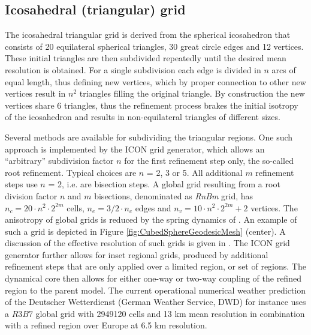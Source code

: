 \documentclass[gmd, manuscript]{copernicus}
\begin{document}

\subsection{Icosahedral (triangular) grid} \label{sec:grid_ico_tri}

The icosahedral triangular grid is derived from the spherical icosahedron that consists of 20 equilateral spherical triangles, 30 great circle edges and 12 vertices.  These initial triangles are then subdivided repeatedly until the desired mean resolution is obtained. For a single subdivision each edge is divided in $n$ arcs of equal length, thus defining new vertices, which by proper connection to other new vertices result in $n^{2}$ triangles filling the original triangle. By construction the new vertices share 6 triangles, thus the refinement process brakes the initial isotropy of the icosahedron and results in non-equilateral triangles of different sizes.

Several methods are available for subdividing the triangular regions.  One such approach is implemented by the ICON grid generator, which allows an ``arbitrary'' subdivision factor $n$ for the first refinement step only, the so-called root refinement. Typical choices are $n$ = 2, 3 or 5. All additional $m$ refinement steps use $n$ = 2, i.e. are bisection steps. A global grid resulting from a root division factor $n$ and $m$ bisections, denominated as \textit{RnBm} grid,  has $n_c = 20 \cdot n^2 \cdot 2^{2m}$ cells, $n_e = 3/2 \cdot n_c$ edges and $n_v = 10\cdot n^{2}\cdot 2^{2m}+2$ vertices. The anisotropy of global grids is reduced by the spring dynamics of \cite{tomita2001shallow}.  An example of such a grid is depicted in Figure \ref{fig:CubedSphereGeodesicMesh} (center).  A discussion of the effective resolution of such grids is given in \cite{dipankar2015large}.  The ICON grid generator further allows for inset regional grids, produced by additional refinement steps that are only applied over a limited region, or set of regions.  The dynamical core then allows for either one-way or two-way coupling of the refined region to the parent model. The current operational numerical weather prediction of the Deutscher Wetterdienst (German Weather Service, DWD) for instance uses a $R3B7$ global grid with 2949120 cells and 13 km mean resolution in combination with a refined region over Europe at 6.5 km resolution.
\end{document}

